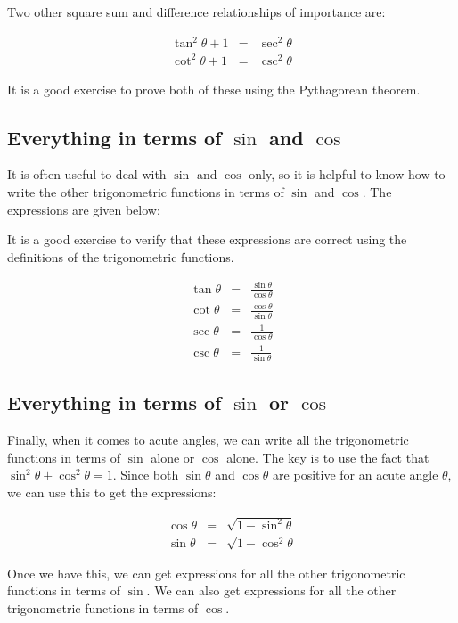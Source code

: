 \documentclass{amsart}
\begin{document}
Two other square sum and difference relationships of importance are:

\begin{eqnarray*}
  \tan^2 \theta + 1 & = & \sec^2 \theta\\
  \cot^2 \theta + 1 & = & \csc^2 \theta
\end{eqnarray*}

It is a good exercise to prove both of these using the Pythagorean theorem.

\subsection{Everything in terms of $\sin$ and $\cos$}

It is often useful to deal with $\sin$ and $\cos$ only, so it is
helpful to know how to write the other trigonometric functions in
terms of $\sin$ and $\cos$. The expressions are given below:

It is a good exercise to verify that these expressions are correct
using the definitions of the trigonometric functions.

\begin{eqnarray*}
  \tan \theta & = & \frac{\sin \theta}{\cos \theta} \\
  \cot \theta & = & \frac{\cos \theta}{\sin \theta} \\
  \sec \theta & = & \frac{1}{\cos \theta}\\
  \csc \theta & = & \frac{1}{\sin \theta}
\end{eqnarray*}


\subsection{Everything in terms of $\sin$ or $\cos$}

Finally, when it comes to acute angles, we can write all the
trigonometric functions in terms of $\sin$ alone or $\cos$ alone. The
key is to use the fact that $\sin^2\theta + \cos^2 \theta = 1$. Since
both $\sin \theta$ and $\cos \theta$ are positive for an acute angle
$\theta$, we can use this to get the expressions:

\begin{eqnarray*}
  \cos \theta & = & \sqrt{1 - \sin^2 \theta}\\
  \sin \theta & = & \sqrt{1 - \cos^2 \theta}
\end{eqnarray*}

Once we have this, we can get expressions for all the other
trigonometric functions in terms of $\sin$. We can also get
expressions for all the other trigonometric functions in terms of
$\cos$.
\end{document}
